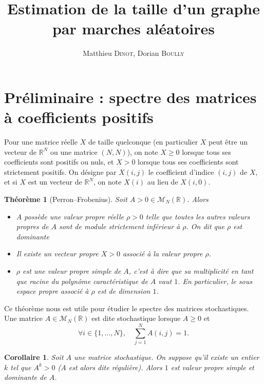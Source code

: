 \documentclass[11pt]{article}
\title{Estimation de la taille d'un graphe par marches aléatoires}
\author{Matthieu \textsc{Dinot}, Dorian \textsc{Boully}}
\date{}
\newcommand{\R}{\mathbb{R}}
\renewcommand{\geq}{\geqslant}
\theoremstyle{plain}
\newtheorem{thm}{Théorème}
\newtheorem{coro}{Corollaire}
\begin{document}
\maketitle
\section*{Préliminaire : spectre des matrices à coefficients positifs}
Pour une matrice réelle $X$ de taille quelconque (en particulier $X$ peut être un vecteur de $\R^{N}$ ou une matrice $(N,N)$), on note $X \geq 0$ lorsque tous ses coefficients sont positifs ou nuls, et $X > 0$ lorsque tous ses coefficients sont strictement positifs. On désigne par $X(i,j)$ le coefficient d'indice $(i,j)$ de $X$, et si $X$ est un vecteur de $\R^{N}$, on note $X(i)$ au lieu de $X(i,0)$.
\begin{thm}[Perron--Frobenius]\label{th:pf}
    Soit $A > 0 \in \mathcal{M}_N (\R)$. Alors
    \begin{itemize}
        \item $A$ possède une valeur propre réelle $\rho > 0$ telle que toutes les autres valeurs propres de $A$ sont de module strictement inférieur à $\rho$. On dit que $\rho$ est dominante
        \item Il existe un vecteur propre $X > 0$ associé à la valeur propre $\rho$.
        \item $\rho$ est une valeur propre simple de $A$, c'est à dire que sa multiplicité en tant que racine du polynôme caractéristique de $A$ vaut $1$. En particulier, le sous espace propre associé à $\rho$ est de dimension $1$.
    \end{itemize}
\end{thm}
Ce théorème nous est utile pour étudier le spectre des matrices stochastiques. Une matrice $A \in \mathcal{M}_N (\R)$ est dite stochastique lorsque $A \geq 0$ et 
$$\forall i \in \{1, \ldots, N\}, \quad \sum_{j = 1}^{N} A(i,j) = 1.$$ 
\begin{coro}\label{coro}
    Soit $A$ une matrice stochastique. On suppose qu'il existe un entier $k$ tel que $A^{k} > 0$ ($A$ est alors dite régulière). Alors $1$ est valeur propre simple et dominante de $A$.
\end{coro}
\end{document}
